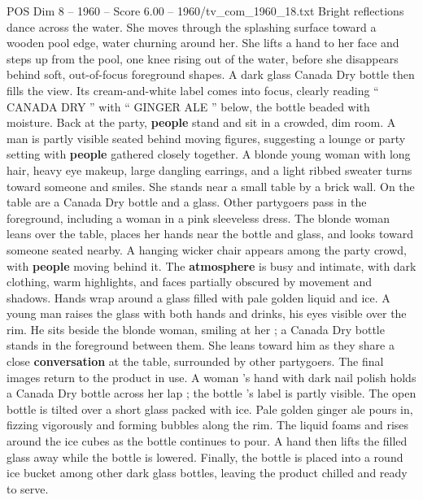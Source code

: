 \begin{textsample}{POS Dim 8 – 1960 – Score 6.00 – 1960/tv\_com\_1960\_18.txt}
Bright reflections dance across the water.
She moves through the splashing surface toward a wooden pool edge, water churning around her.
She lifts a hand to her face and steps up from the pool, one knee rising out of the water, before she disappears behind soft, out-of-focus foreground shapes.
A dark glass Canada Dry bottle then fills the view.
Its cream-and-white label comes into focus, clearly reading “ CANADA DRY ” with “ GINGER ALE ” below, the bottle beaded with moisture.
Back at the party, \textbf{people} stand and sit in a crowded, dim room.
A man is partly visible seated behind moving figures, suggesting a lounge or party setting with \textbf{people} gathered closely together.
A blonde young woman with long hair, heavy eye makeup, large dangling earrings, and a light ribbed sweater turns toward someone and smiles.
She stands near a small table by a brick wall.
On the table are a Canada Dry bottle and a glass.
Other partygoers pass in the foreground, including a woman in a pink sleeveless dress.
The blonde woman leans over the table, places her hands near the bottle and glass, and looks toward someone seated nearby.
A hanging wicker chair appears among the party crowd, with \textbf{people} moving behind it.
The \textbf{atmosphere} is busy and intimate, with dark clothing, warm highlights, and faces partially obscured by movement and shadows.
Hands wrap around a glass filled with pale golden liquid and ice.
A young man raises the glass with both hands and drinks, his eyes visible over the rim.
He sits beside the blonde woman, smiling at her ; a Canada Dry bottle stands in the foreground between them.
She leans toward him as they share a close \textbf{conversation} at the table, surrounded by other partygoers.
The final images return to the product in use.
A woman ’s hand with dark nail polish holds a Canada Dry bottle across her lap ; the bottle ’s label is partly visible.
The open bottle is tilted over a short glass packed with ice.
Pale golden ginger ale pours in, fizzing vigorously and forming bubbles along the rim.
The liquid foams and rises around the ice cubes as the bottle continues to pour.
A hand then lifts the filled glass away while the bottle is lowered.
Finally, the bottle is placed into a round ice bucket among other dark glass bottles, leaving the product chilled and ready to serve.

\end{textsample}
